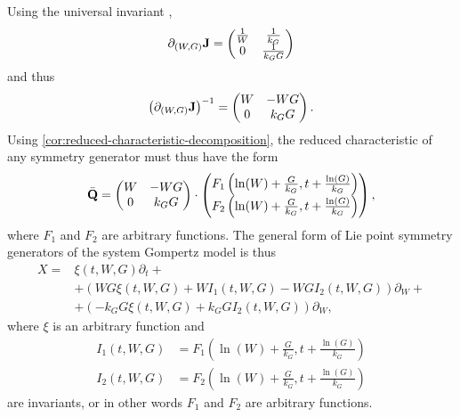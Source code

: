 Using the universal invariant ,
\begin{equation}
  \partial_{(W, G)} \vb{J} =
  \begin{pmatrix}
    \frac{1}{W} & \frac{1}{k_G} \\
    0 & \frac{1}{k_G G}
  \end{pmatrix}
\end{equation}
and thus
\begin{equation}
  \left(\partial_{(W, G)} \vb{J}\right)^{-1} =
  \begin{pmatrix}
    W & - W G \\
    0 & k_G G
  \end{pmatrix}.
\end{equation}
Using \cref{cor:reduced-characteristic-decomposition}, the reduced characteristic of any symmetry generator must thus have the form
\begin{equation}
  \bar{\vb{Q}} =
  \begin{pmatrix}
    W & - W G \\
    0 & k_G G
  \end{pmatrix}
  \cdot
  \begin{pmatrix}
    F_1\left(\ln(W) + \frac{G}{k_G}, t + \frac{\ln(G)}{k_G}\right) \\
    F_2\left(\ln(W) + \frac{G}{k_G}, t + \frac{\ln(G)}{k_G}\right)
  \end{pmatrix},
\end{equation}
where \(F_1\) and \(F_2\) are arbitrary functions.
The general form of Lie point symmetry generators of the system Gompertz model is thus
\begin{align}
  X =& \xi(t, W, G) \partial_t + \\
  &+ \left(W G \xi(t, W, G) + W I_1(t, W, G) - W G I_2(t, W, G)\right) \partial_W + \\
  &+ \left(-k_G G \xi(t, W, G) + k_G G I_2(t, W, G)\right) \partial_W,
\end{align}
where \(\xi\) is an arbitrary function and
\begin{align}
  I_1(t, W, G) &= F_1\left(\ln(W) + \frac{G}{k_G}, t + \frac{\ln(G)}{k_G}\right) \\
  I_2(t, W, G) &= F_2\left(\ln(W) + \frac{G}{k_G}, t + \frac{\ln(G)}{k_G}\right)
\end{align}
are invariants, or in other words \(F_1\) and \(F_2\) are arbitrary functions.

